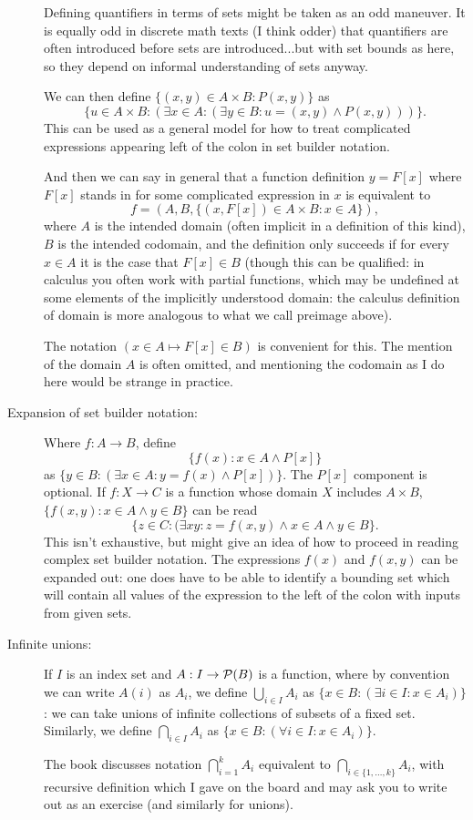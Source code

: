 \documentclass[12pt]{article}
\begin{document}
\begin{description}
Defining quantifiers in terms of sets might be taken as an odd maneuver.  It is equally odd in discrete math texts (I think odder) that quantifiers are often introduced before sets are introduced...but with set bounds as here, so they depend on informal understanding of sets anyway.

We can then define $\{(x,y) \in A \times B:P(x,y)\}$ as $$\{u \in A \times B:(\exists x \in A:(\exists y \in B:u=(x,y) \wedge P(x,y)))\}.$$ This can be used as a general model for how to treat complicated expressions appearing left of the colon in set builder notation.

And then we can say in general that a function definition $y = F[x]$ where $F[x]$ stands in for some complicated expression in $x$ is equivalent to $$f=(A,B,\{(x,F[x]) \in A \times B:x\in A\}),$$  where $A$ is the intended domain (often implicit in a definition of this kind), $B$ is the intended codomain, and the definition only succeeds if for every $x \in A$ it is the case that $F[x] \in B$ (though this can be qualified:  in calculus you often work with partial functions, which may be undefined at some elements of the implicitly understood domain:  the calculus definition of domain is more analogous to what we call preimage above).

The notation $(x \in A \mapsto F[x] \in B)$ is convenient for this.  The mention of the domain $A$ is often omitted, and mentioning the codomain as I do here would be strange in practice.

\item[Expansion of set builder notation:]  Where $f:A \rightarrow B$, define $$\{f(x):x \in A\wedge P[x]\}$$ as
$\{y \in B:(\exists x\in A:y=f(x) \wedge P[x])\}$.  The $P[x]$ component is optional.  If $f:X \rightarrow C$
is a function whose domain $X$ includes $A \times B$, $\{f(x,y):x \in A \wedge y \in B\}$ can be read
$$\{z \in C:(\exists xy:z=f(x,y) \wedge x \in A \wedge y \in B\}.$$ This isn't exhaustive, but might give an idea of how to proceed in reading complex set builder notation.  The expressions $f(x)$ and $f(x,y)$ can be expanded out:  one does have to be able to identify a bounding set which will contain all values of the expression to the left of the colon with inputs from given sets.

\item[Infinite unions:]  If $I$ is an index set and $A:I\rightarrow {\cal P}(B)$ is a function, where by convention we can write $A(i)$ as $A_i$, we define $\bigcup_{i \in I}A_i$ as $\{x \in B:(\exists i \in I:x \in A_i)\}$:  we can take unions of infinite collections of subsets of a fixed set.   Similarly, we define $\bigcap_{i \in I}A_i$ as $\{x \in B:(\forall i \in I:x \in A_i)\}$.

The book discusses notation $\bigcap_{i=1}^k A_i$ equivalent to $\bigcap_{i \in \{1,\ldots,k\}} A_i$, with recursive definition which I gave on the board and may ask you to write out as an exercise (and similarly for unions).

\end{description}
\end{document}
